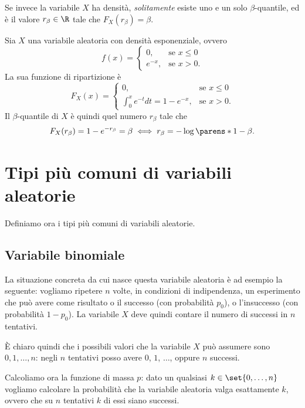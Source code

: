 Se invece la variabile $X$ ha densità, \emph{solitamente} esiste uno e un solo $\beta$-quantile, ed è il valore $r_\beta \in \R$ tale che $F_X(r_\beta) = \beta$.

\begin{example}
    Sia $X$ una variabile aleatoria con densità esponenziale, ovvero \[
        f(x) = \begin{cases}
            0, &\text{se } x \leq 0\\
            e^{-x}, &\text{se } x > 0.
        \end{cases}    
    \] La sua funzione di ripartizione è \[
        F_X(x) = \begin{cases}
            0, &\text{se } x \leq 0\\
            \int_0^x e^{-t}dt = 1 - e^{-x}, &\text{se } x > 0.
        \end{cases}    
    \] Il $\beta$-quantile di $X$ è quindi quel numero $r_\beta$ tale che \begin{align*}
        F_X(r_\beta) = 1 - e^{-r_\beta} = \beta \iff r_\beta = -\log\parens*{1 - \beta}.
    \end{align*} 
\end{example}

\section{Tipi più comuni di variabili aleatorie}
Definiamo ora i tipi più comuni di variabili aleatorie.

\subsection{Variabile binomiale}
La situazione concreta da cui nasce questa variabile aleatoria è ad esempio la seguente: vogliamo ripetere $n$ volte, in condizioni di indipendenza, un esperimento che può avere come risultato o il successo (con probabilità $p_0$), o l'insuccesso (con probabilità $1 - p_0$).
La variabile $X$ deve quindi contare il numero di successi in $n$ tentativi.

È chiaro quindi che i possibili valori che la variabile $X$ può assumere sono $0, 1, \dots, n$: negli $n$ tentativi posso avere $0$, $1$, $\dots$, oppure $n$ successi.

Calcoliamo ora la funzione di massa $p$: dato un qualsiasi $k \in \set{0, \dots, n}$ vogliamo calcolare la probabilità che la variabile aleatoria valga esattamente $k$, ovvero che su $n$ tentativi $k$ di essi siano successi.


